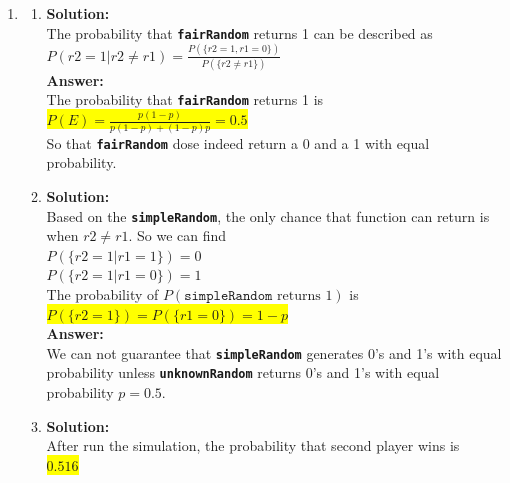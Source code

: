 \documentclass{article}
\newcommand{\myansw}{\textbf{Answer:}\\}
\newcommand{\mysolu}{\textbf{Solution:}\\}
\begin{document}
\begin{enumerate}
\begin{enumerate}
	\end{enumerate}
	\item
	\begin{enumerate}
		\item
		\mysolu
		The probability that \textbf{\texttt{fairRandom}} returns 1 can be described as\\
		${P({r2 = 1|r2\neq r1})=\frac{P(\{r2 = 1, r1 = 0\})}{P(\{r2 \neq r1\})}}$\\
		\myansw
		The probability that \textbf{\texttt{fairRandom}} returns 1 is\\
		\colorbox{yellow}{${P(E)= \frac{p(1-p)}{p(1-p)+(1-p)p}=0.5}$}\\
		So that \textbf{\texttt{fairRandom}} dose indeed return a 0 and a 1 with equal probability.
		\item
		\mysolu
		Based on the \textbf{\texttt{simpleRandom}}, the only chance that function can return is when ${r2 \neq r1}$. So we can find\\
		${P(\{r2 = 1|r1 = 1\})=0}$\\
		${P(\{r2 = 1|r1 = 0\})=1}$\\
		The probability of ${P(\texttt{simpleRandom}\text{ returns 1})}$ is\\
		\colorbox{yellow}{
		${P(\{r2 = 1\})=P(\{r1=0\})=1-p}$}\\
		\myansw
		We can not guarantee that \textbf{\texttt{simpleRandom}} generates 0's and 1's with equal probability unless \textbf{\texttt{unknownRandom}} returns 0's and 1's with equal probability ${p = 0.5}$.
		\item
		\mysolu
		After run the simulation, the probability that second player wins is\\
		\colorbox{yellow}{${0.516}$}
		

\end{enumerate}
\end{enumerate}
\end{document}
